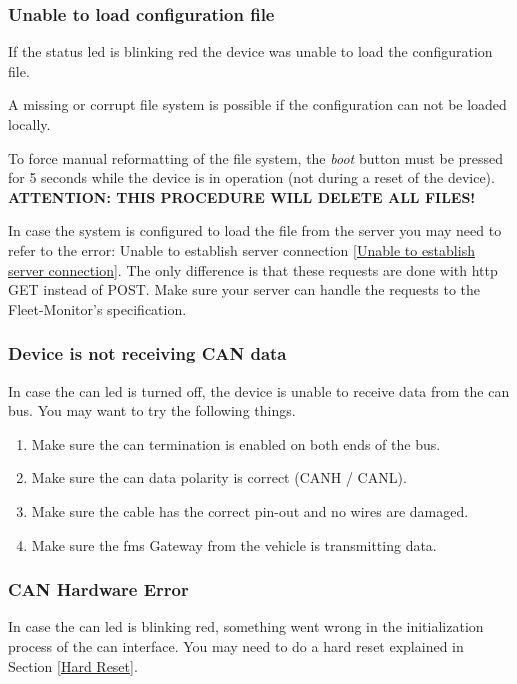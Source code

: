 \subsubsection{Unable to load configuration file}
If the status \acrshort{led} is blinking red the device was unable to load the configuration file. 

A missing or corrupt file system is possible if the configuration can not be loaded locally.

To force manual reformatting of the file system, the \textit{boot} button must be pressed for 5 seconds while the device is in operation (not during a reset of the device).\\
\textbf{ATTENTION: THIS PROCEDURE WILL DELETE ALL FILES!}

In case the system is configured to load the file from the server you may need to refer to the error: Unable to establish server connection \ref{Unable to establish server connection}. The only difference is that these requests are done with \acrshort{http} GET instead of POST. Make sure your server can handle the requests to the Fleet-Monitor's specification.

\subsubsection{Device is not receiving CAN data}
In case the \acrshort{can} \acrshort{led} is turned off, the device is unable to receive data from the \acrshort{can} bus. You may want to try the following things.

\begin{enumerate}
  \item Make sure the \acrshort{can} termination is enabled on both ends of the bus.
  \item Make sure the \acrshort{can} data polarity is correct (CANH / CANL).
  \item Make sure the cable has the correct pin-out and no wires are damaged. 
  \item Make sure the \acrshort{fms} Gateway from the vehicle is transmitting data.
\end{enumerate}

\subsubsection{CAN Hardware Error}
In case the \acrshort{can} \acrshort{led} is blinking red, something went wrong in the initialization process of the \acrshort{can} interface. You may need to do a hard reset explained in Section \ref{Hard Reset}.

